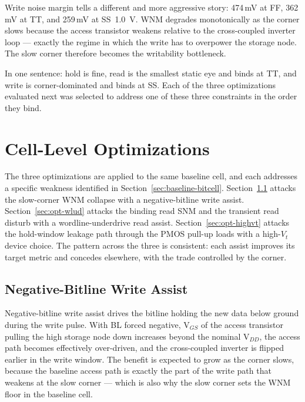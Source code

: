 \documentclass[pdflatex,sn-mathphys-num]{sn-jnl}%
\theoremstyle{thmstyleone}%
\theoremstyle{thmstyletwo}%
\theoremstyle{thmstylethree}%
\begin{document}
Write noise margin tells a different and more aggressive story: 474\,mV at FF, 362\,mV at TT, and 259\,mV at SS~1.0~V. WNM degrades monotonically as the corner slows because the access transistor weakens relative to the cross-coupled inverter loop — exactly the regime in which the write has to overpower the storage node. The slow corner therefore becomes the writability bottleneck.

In one sentence: hold is fine, read is the smallest static eye and binds at TT, and write is corner-dominated and binds at SS. Each of the three optimizations evaluated next was selected to address one of these three constraints in the order they bind.

\section{Cell-Level Optimizations}\label{sec:optimizations}

The three optimizations are applied to the same baseline cell, and each addresses a specific weakness identified in Section~\ref{sec:baseline-bitcell}. Section~\ref{sec:opt-negbl} attacks the slow-corner WNM collapse with a negative-bitline write assist. Section~\ref{sec:opt-wlud} attacks the binding read SNM and the transient read disturb with a wordline-underdrive read assist. Section~\ref{sec:opt-highvt} attacks the hold-window leakage path through the PMOS pull-up loads with a high-$V_t$ device choice. The pattern across the three is consistent: each assist improves its target metric and concedes elsewhere, with the trade controlled by the corner.

\subsection{Negative-Bitline Write Assist}\label{sec:opt-negbl}

Negative-bitline write assist drives the bitline holding the new data below ground during the write pulse. With BL forced negative, V$_{GS}$ of the access transistor pulling the high storage node down increases beyond the nominal V$_{DD}$, the access path becomes effectively over-driven, and the cross-coupled inverter is flipped earlier in the write window. The benefit is expected to grow as the corner slows, because the baseline access path is exactly the part of the write path that weakens at the slow corner — which is also why the slow corner sets the WNM floor in the baseline cell.
\end{document}
